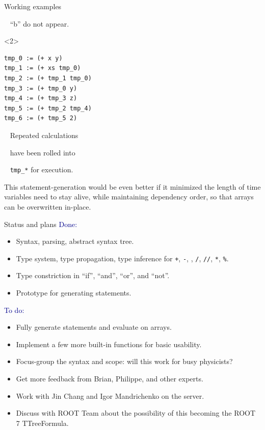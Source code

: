 \documentclass{beamer}
\begin{document}
\begin{frame}[fragile]{Working examples}
\begin{minipage}[t][12cm][t]{\textwidth}
\begin{onlyenv}
\mbox{ } \hfill ``b'' do not appear.

\vspace{6 cm}
\end{onlyenv}
\begin{onlyenv}<2>
\begin{lstlisting}[basicstyle=\ttfamily\small]
tmp_0 := (+ x y)
tmp_1 := (+ xs tmp_0)
tmp_2 := (+ tmp_1 tmp_0)
tmp_3 := (+ tmp_0 y)
tmp_4 := (+ tmp_3 z)
tmp_5 := (+ tmp_2 tmp_4)
tmp_6 := (+ tmp_5 2)
\end{lstlisting}
\vspace{-3 cm}
\normalsize
\mbox{ } \hfill Repeated calculations

\mbox{ } \hfill have been rolled into

\mbox{ } \hfill {\tt\small tmp\_*} for execution.

\vspace{2 cm}

This statement-generation would be even better if it minimized the length of time variables need to stay alive, while maintaining dependency order, so that arrays can be overwritten in-place.
\end{onlyenv}
\end{minipage}
\end{frame}

\begin{frame}{Status and plans}
\vspace{0.3 cm}
\textcolor{darkblue}{Done:}
\begin{itemize}
\item Syntax, parsing, abstract syntax tree.
\item Type system, type propagation, type inference for {\tt +}, {\tt -}, {\tt *}, {\tt /}, {\tt //}, {\tt **}, {\tt \%}.
\item Type constriction in ``if'', ``and'', ``or'', and ``not''.
\item Prototype for generating statements.
\end{itemize}

\vfill
\textcolor{darkblue}{To do:}
\begin{itemize}
\item Fully generate statements and evaluate on arrays.
\item Implement a few more built-in functions for basic usability.
\item Focus-group the syntax and scope: will this work for busy physicists?
\item Get more feedback from Brian, Philippe, and other experts.
\item Work with Jin Chang and Igor Mandrichenko on the server.
\item Discuss with ROOT Team about the possibility of this becoming the ROOT 7 TTreeFormula.
\end{itemize}
\end{frame}
\end{document}
